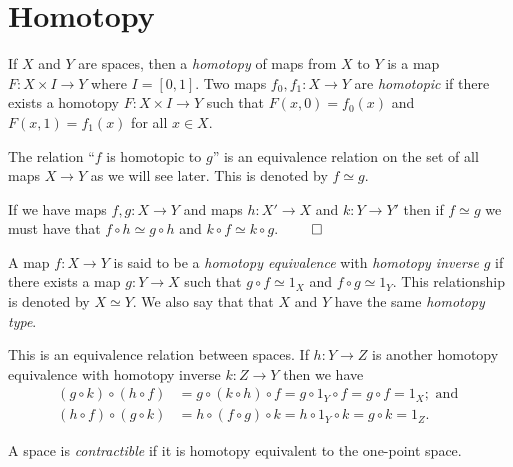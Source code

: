 \documentclass[letterpaper, 11pt, oneside]{book}
\begin{document}
\chapter{Homotopy}

\begin{defn}[Homotopy]
  If $X$ and $Y$ are spaces, then a \emph{homotopy} of maps from $X$ to $Y$ is a map $F\colon X \times I \to Y$ where $I = [0, 1]$.
  Two maps $f_{0}, f_{1}\colon X \to Y$ are \emph{homotopic} if there exists a homotopy $F\colon X \times I \to Y$ such that $F(x, 0) = f_{0}(x)$ and $F(x, 1) = f_{1}(x)$ for all $x \in X$.
\end{defn}

The relation ``$f$ is homotopic to $g$'' is an equivalence relation on the set of all maps $X \to Y$ as we will see later.
This is denoted by $f \simeq g$.

\begin{prop}
  If we have maps $f, g\colon X \to Y$ and maps $h\colon X' \to X$ and $k\colon Y \to Y'$ then if $f \simeq g$ we must have that $f \circ h \simeq g \circ h$ and $k \circ f \simeq k \circ g$. $\qed$
\end{prop}

\begin{defn}
  A map $f\colon X \to Y$ is said to be a \emph{homotopy equivalence} with \emph{homotopy inverse} $g$ if there exists a map $g\colon Y \to X$ such that $g \circ f \simeq 1_{X}$ and $f \circ g \simeq 1_{Y}$.
  This relationship is denoted by $X \simeq Y$.
  We also say that that $X$ and $Y$ have the same \emph{homotopy type}.
\end{defn}

This is an equivalence relation between spaces.
If $h\colon Y \to Z$ is another homotopy equivalence with homotopy inverse $k\colon Z \to Y$ then we have
\begin{align*}
  (g \circ k) \circ (h \circ f) &= g \circ (k \circ h) \circ f = g \circ 1_{Y} \circ f = g \circ f = 1_{X}; \text{ and } \\
  (h \circ f) \circ (g \circ k) &= h \circ (f \circ g) \circ k = h \circ 1_{Y} \circ k = g \circ k = 1_{Z}.
\end{align*}

\begin{defn}[Contractible]
  A space is \emph{contractible} if it is homotopy equivalent to the one-point space.
\end{defn}

\clearpage
\end{document}

